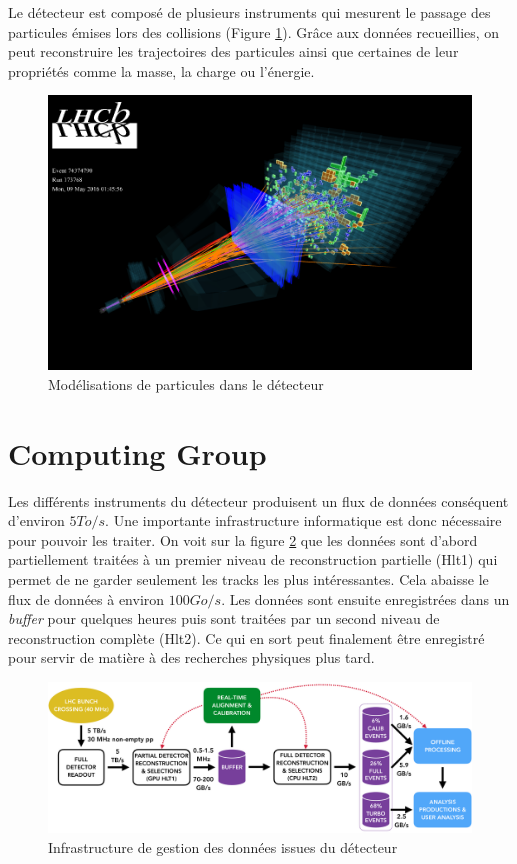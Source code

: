 \documentclass[a4paper,11pt]{report}
\begin{document}
Le détecteur est composé de plusieurs instruments qui mesurent le passage des particules émises lors des collisions (Figure \ref{LHCb_3D}).
Grâce aux données recueillies, on peut reconstruire les trajectoires des particules ainsi que certaines de leur propriétés comme la masse, la charge ou l'énergie.

\begin{figure}[H]
    \includegraphics[width=\textwidth, center]{LHCb_3D.png}
    \caption{Modélisations de particules dans le détecteur}
    \label{LHCb_3D}
\end{figure}

\section{Computing Group}
Les différents instruments du détecteur produisent un flux de données conséquent d'environ $5 To/s$.
Une importante infrastructure informatique est donc nécessaire pour pouvoir les traiter.
On voit sur la figure \ref{LHCb_stack} que les données sont d'abord partiellement traitées à un premier niveau de reconstruction partielle (Hlt1) qui permet de ne garder seulement les tracks les plus intéressantes.
Cela abaisse le flux de données à environ $100 Go/s$.
Les données sont ensuite enregistrées dans un \emph{buffer} pour quelques heures puis sont traitées par un second niveau de reconstruction complète (Hlt2).
Ce qui en sort peut finalement être enregistré pour servir de matière à des recherches physiques plus tard.

\begin{figure}[H]
    \includegraphics[width=\textwidth, center]{LHCb_stack.png}
    \caption{Infrastructure de gestion des données issues du détecteur}
    \label{LHCb_stack}
\end{figure}
\end{document}
